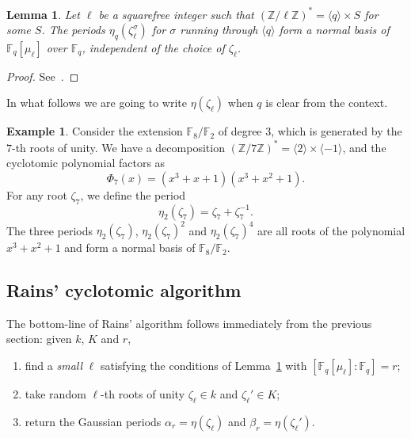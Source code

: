\documentclass[12pt]{article}
\theoremstyle{plain}
\newtheorem{lemma}[theorem]{Lemma}
\theoremstyle{definition}
\newtheorem{example}[theorem]{Example}
\def\Z{\ensuremath{\mathbb{Z}}}
\def\F{\ensuremath{\mathbb{F}}}
\newcounter{algorithm}
\begin{document}
\begin{lemma}
  \label{th:gaussian}
  Let $\ell$ be a squarefree integer such that $(\Z/\ell\Z)^\ast =
  \langle q\rangle \times S$ for some $S$.  The periods
  $\eta_q(\zeta_\ell^\sigma)$ for $\sigma$ running through $\langle
  q\rangle$ form a normal basis of $\F_q[\mu_\ell]$ over $\F_q$,
  independent of the choice of $\zeta_\ell$.
\end{lemma}
\begin{proof}
  See~\cite[Main Theorem]{feisel1999normal}.
\end{proof}

In what follows we are going to write $\eta(\zeta_\ell)$ when $q$ is
clear from the context.

\begin{example} 
  Consider the extension $\F_8/\F_2$ of degree $3$, which is generated
  by the $7$-th roots of unity. We have a decomposition
  $(\Z/7\Z)^\ast=\langle 2\rangle\times\langle-1\rangle$, and the
  cyclotomic polynomial factors as
  \begin{equation}
    \Phi_7(x) = (x^3 + x + 1) (x^3 + x^2 + 1).
  \end{equation}
  For any root $\zeta_7$, we define the period
  \begin{equation}
    \eta_2(\zeta_7) = \zeta_7+\zeta_7^{-1}.
  \end{equation}
  The three periods $\eta_2(\zeta_7)$, $\eta_2(\zeta_7)^2$ and
  $\eta_2(\zeta_7)^4$ are all roots of the polynomial $x^3+x^2+1$ and
  form a normal basis of $\F_8/\F_2$.
\end{example}

\subsection{Rains' cyclotomic algorithm}

The bottom-line of Rains' algorithm follows immediately from the
previous section: given $k$, $K$ and $r$,
\begin{enumerate}
\item find a \emph{small} $\ell$ satisfying the conditions of
  Lemma~\ref{th:gaussian} with $[\F_q[\mu_\ell]:\F_q]=r$;
\item take random $\ell$-th roots of unity $\zeta_\ell\in k$ and
  $\zeta_\ell'\in K$;
\item return the Gaussian periods $\alpha_r=\eta(\zeta_\ell)$ and
  $\beta_r=\eta(\zeta_\ell')$.
\end{enumerate}
\end{document}

